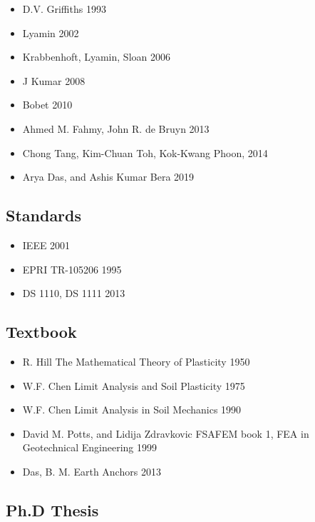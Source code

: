 \documentclass[a4paper, nobind]{templates/ociamthesis}
\providecommand{\tightlist}{%
  \setlength{\itemsep}{0pt}\setlength{\parskip}{0pt}}
\begin{document}
\begin{itemize}
\tightlist
\item
  D.V. Griffiths 1993
\item
  Lyamin 2002
\item
  Krabbenhoft, Lyamin, Sloan 2006
\item
  J Kumar 2008
\item
  Bobet 2010
\item
  Ahmed M. Fahmy, John R. de Bruyn 2013
\item
  Chong Tang, Kim-Chuan Toh, Kok-Kwang Phoon, 2014
\item
  Arya Das, and Ashis Kumar Bera 2019
\end{itemize}

\hypertarget{standards}{%
\subsection{Standards}\label{standards}}

\begin{itemize}
\tightlist
\item
  IEEE 2001
\item
  EPRI TR-105206 1995
\item
  DS 1110, DS 1111 2013
\end{itemize}

\hypertarget{textbook}{%
\subsection{Textbook}\label{textbook}}

\begin{itemize}
\tightlist
\item
  R. Hill The Mathematical Theory of Plasticity 1950
\item
  W.F. Chen Limit Analysis and Soil Plasticity 1975
\item
  W.F. Chen Limit Analysis in Soil Mechanics 1990
\item
  David M. Potts, and Lidija Zdravkovic FSAFEM book 1, FEA in Geotechnical Engineering 1999
\item
  Das, B. M. Earth Anchors 2013
\end{itemize}

\hypertarget{ph.d-thesis}{%
\subsection{Ph.D Thesis}\label{ph.d-thesis}}
\end{document}
